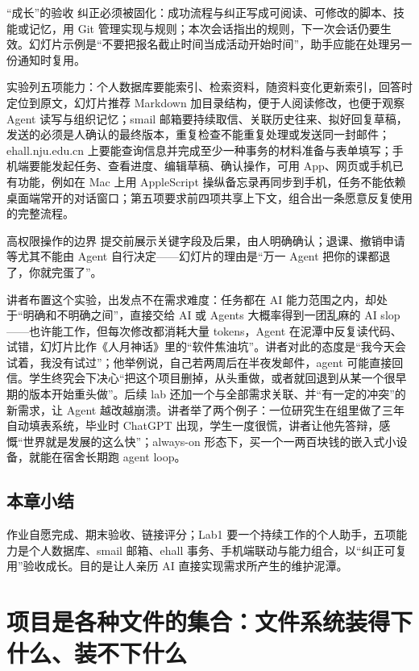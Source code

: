 \documentclass[a4paper]{article}
\begin{document}
\begin{importantbox}{“成长”的验收}
纠正必须被固化：成功流程与纠正写成可阅读、可修改的脚本、技能或记忆，用 Git 管理实现与规则；本次会话指出的规则，下一次会话仍要生效。幻灯片示例是“不要把报名截止时间当成活动开始时间”，助手应能在处理另一份通知时复用。
\end{importantbox}

实验列五项能力：个人数据库要能索引、检索资料，随资料变化更新索引，回答时定位到原文，幻灯片推荐 Markdown 加目录结构，便于人阅读修改，也便于观察 Agent 读写与组织记忆；smail 邮箱要持续取信、关联历史往来、拟好回复草稿，发送的必须是人确认的最终版本，重复检查不能重复处理或发送同一封邮件；ehall.nju.edu.cn 上要能查询信息并完成至少一种事务的材料准备与表单填写；手机端要能发起任务、查看进度、编辑草稿、确认操作，可用 App、网页或手机已有功能，例如在 Mac 上用 AppleScript 操纵备忘录再同步到手机，任务不能依赖桌面端常开的对话窗口；第五项要求前四项共享上下文，组合出一条愿意反复使用的完整流程。

\begin{warningbox}{高权限操作的边界}
提交前展示关键字段及后果，由人明确确认；退课、撤销申请等尤其不能由 Agent 自行决定——幻灯片的理由是“万一 Agent 把你的课都退了，你就完蛋了”。
\end{warningbox}

讲者布置这个实验，出发点不在需求难度：任务都在 AI 能力范围之内，却处于“明确和不明确之间”，直接交给 AI 或 Agents 大概率得到一团乱麻的 AI slop——也许能工作，但每次修改都消耗大量 tokens，Agent 在泥潭中反复读代码、试错，幻灯片比作《人月神话》里的“软件焦油坑”。讲者对此的态度是“我今天会试着，我没有试过”；他举例说，自己若两周后在半夜发邮件，agent 可能直接回信。学生终究会下决心“把这个项目删掉，从头重做，或者就回退到从某一个很早期的版本开始重头做”。后续 lab 还加一个与全部需求关联、并“有一定的冲突”的新需求，让 Agent 越改越崩溃。讲者举了两个例子：一位研究生在组里做了三年自动填表系统，毕业时 ChatGPT 出现，学生一度很慌，讲者让他先答辩，感慨“世界就是发展的这么快”；always-on 形态下，买一个一两百块钱的嵌入式小设备，就能在宿舍长期跑 agent loop。

\subsection{本章小结}
作业自愿完成、期末验收、链接评分；Lab1 要一个持续工作的个人助手，五项能力是个人数据库、smail 邮箱、ehall 事务、手机端联动与能力组合，以“纠正可复用”验收成长。目的是让人亲历 AI 直接实现需求所产生的维护泥潭。

\section{项目是各种文件的集合：文件系统装得下什么、装不下什么}
\end{document}
